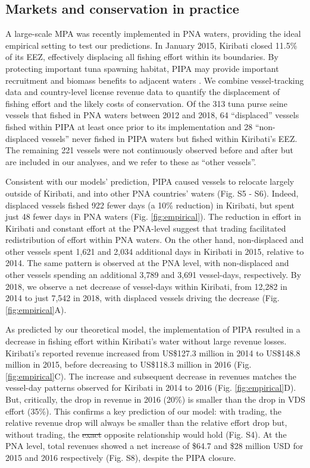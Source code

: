 \documentclass[12pt]{article}
\providecommand{\DIFaddtex}[1]{{\protect\color{blue}\uwave{#1}}} %
\providecommand{\DIFdeltex}[1]{{\protect\color{red}\sout{#1}}}                      %
\providecommand{\DIFaddbegin}{} %
\providecommand{\DIFaddend}{} %
\providecommand{\DIFdelbegin}{} %
\providecommand{\DIFdelend}{} %
\providecommand{\DIFadd}[1]{\texorpdfstring{\DIFaddtex{#1}}{#1}} %
\providecommand{\DIFdel}[1]{\texorpdfstring{\DIFdeltex{#1}}{}} %
\newcommand{\DIFscaledelfig}{0.5}
\newlength{\DIFdelgraphicswidth} %
\newlength{\DIFdelgraphicsheight} %
\newcommand{\DIFaddincludegraphics}[2][]{{\color{blue}\fbox{\DIFOincludegraphics[#1]{#2}}}} %
\newcommand{\DIFdelincludegraphics}[2][]{%
\sbox{\DIFdelgraphicsbox}{\DIFOincludegraphics[#1]{#2}}%
\settoboxwidth{\DIFdelgraphicswidth}{\DIFdelgraphicsbox} %
\settoboxtotalheight{\DIFdelgraphicsheight}{\DIFdelgraphicsbox} %
\scalebox{\DIFscaledelfig}{%
\parbox[b]{\DIFdelgraphicswidth}{\usebox{\DIFdelgraphicsbox}\\[-\baselineskip] \rule{\DIFdelgraphicswidth}{0em}}\llap{\resizebox{\DIFdelgraphicswidth}{\DIFdelgraphicsheight}{%
\setlength{\unitlength}{\DIFdelgraphicswidth}%
\begin{picture}(1,1)%
\thicklines\linethickness{2pt} %
{\color[rgb]{1,0,0}\put(0,0){\framebox(1,1){}}}%
{\color[rgb]{1,0,0}\put(0,0){\line( 1,1){1}}}%
{\color[rgb]{1,0,0}\put(0,1){\line(1,-1){1}}}%
\end{picture}%
}\hspace*{3pt}}} %
} %
\DeclareRobustCommand{\DIFaddbegin}{\DIFOaddbegin \let\includegraphics\DIFaddincludegraphics} %
\DeclareRobustCommand{\DIFaddend}{\DIFOaddend \let\includegraphics\DIFOincludegraphics} %
\DeclareRobustCommand{\DIFdelbegin}{\DIFOdelbegin \let\includegraphics\DIFdelincludegraphics} %
\DeclareRobustCommand{\DIFdelend}{\DIFOaddend \let\includegraphics\DIFOincludegraphics} %
\begin{document}
\subsection{Markets and conservation in practice}

A large-scale MPA was recently implemented in PNA waters, providing the ideal empirical setting to test our predictions. In January 2015, Kiribati closed 11.5\% of its EEZ, effectively displacing all fishing effort within its boundaries\cite{mccauley_2016,mcdermott_2018}. By protecting important tuna spawning habitat, PIPA may provide important recruitment and biomass benefits to adjacent waters \cite{hernndez_2019}. We combine vessel-tracking data \cite{kroodsma_2018} and country-level license revenue data \cite{ffa_2017} to quantify the displacement of fishing effort and the likely costs of conservation. Of the 313 tuna purse seine vessels that fished in PNA waters between 2012 and 2018, 64 ``displaced'' vessels fished within PIPA at least once prior to its implementation and 28 ``non-displaced vessels'' never fished in PIPA waters but fished within Kiribati's EEZ. The remaining 221 vessels were not continuously observed before and after but are included in our analyses, and we refer to these as ``other vessels''.

Consistent with our models' prediction, PIPA caused vessels to relocate largely outside of Kiribati, and into other PNA countries' waters (Fig. S5 - S6). Indeed, displaced vessels fished 922 fewer days (a 10\% reduction) in Kiribati, but spent just 48 fewer days in PNA waters (Fig. \ref{fig:empirical}).  The reduction in effort in Kiribati and constant effort at the PNA-level suggest that trading facilitated redistribution of effort within PNA waters\DIFaddbegin \DIFadd{, just as the model predicted}\DIFaddend . On the other hand, non-displaced and other vessels spent 1,621 and 2,034 additional days in Kiribati in 2015, relative to 2014. The same pattern is observed at the PNA level, with non-displaced and other vessels spending an additional 3,789 and 3,691 vessel-days, respectively. By 2018, we observe a net decrease of vessel-days within Kiribati, from 12,282 in 2014 to just 7,542 in 2018, with displaced vessels driving the decrease (Fig. \ref{fig:empirical}A).

As predicted by our theoretical model, the implementation of PIPA resulted in a decrease in fishing effort within Kiribati's water without large revenue losses. Kiribati's reported revenue increased from US\$127.3 million in 2014 to US\$148.8 million in 2015, before decreasing to US\$118.3 million in 2016 (Fig. \ref{fig:empirical}C). The increase and subsequent decrease in revenues matches the vessel-day patterns observed for Kiribati in 2014 to 2016 (Fig. \ref{fig:empirical}D). But, critically, the drop in revenue in 2016 (20\%) is smaller than the drop in VDS effort (35\%). This confirms a key prediction of our model: with trading, the relative revenue drop will always be smaller than the relative effort drop but, without trading, the \DIFdelbegin \DIFdel{exact }\DIFdelend opposite relationship would hold (Fig. S4). At the PNA level, total revenues showed a net increase of \$64.7 and \$28 million USD for 2015 and 2016 respectively (Fig. S8), despite the PIPA closure.
\end{document}
